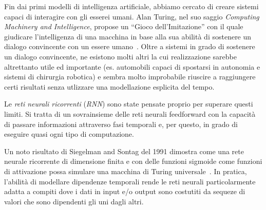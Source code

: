Fin dai primi modelli di intelligenza artificiale, abbiamo cercato di creare sistemi capaci di interagire con gli esserei umani.
Alan Turing, nel suo saggio \emph{Computing Machinery and Intelligence}, propose un ``Gioco dell'Imitazione'' con il quale giudicare l'intelligenza di una macchina in base alla sua abilit\`a di sostenere un dialogo convincente con un essere umano~\cite{Turing:1950}.
Oltre a sistemi in grado di sostenere un dialogo convincente, ne esistono molti altri la cui realizzazione sarebbe altrettanto utile ed importante (es. automobili capaci di spostarsi in autonomia e sistemi di chirurgia robotica) e sembra molto improbabile riuscire a raggiungere certi risultati senza utlizzare una modellazione esplicita del tempo.

Le \emph{reti neurali ricorrenti} (\emph{RNN}) sono state pensate proprio per superare questi limiti.
Si tratta di un sovrainsieme delle reti neurali feedforward con la capacit\`a di passare informazioni attraverso fasi temporali e, per questo, in grado di eseguire quasi ogni tipo di computazione.

Un noto risultato di Siegelman and Sontag del 1991 dimostra come una rete neurale ricorrente di dimensione finita e con delle funzioni sigmoide come funzioni di attivazione possa simulare una macchina di Turing universale~\cite{Siegelmann:1991}.
In pratica, l'abilit\`a di modellare dipendenze temporali rende le reti neurali particolarmente adatta a compiti dove i dati in input e/o output sono costutiti da sequeze di valori che sono dipendenti gli uni dagli altri.


